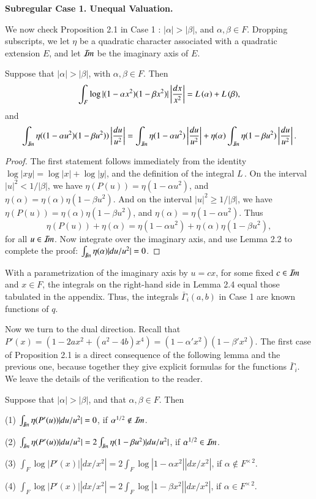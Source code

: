 \documentclass{amsart}
\newcommand\leftd[1]{\left | {d#1\over #1^2}\right |}
\newcommand\leftdx{\leftd x}
\newcommand\leftdu{\leftd u}
\newcommand\Imm{{\mathcal I\hskip-.2em m}}
\newcommand\LOG{{L\,}}
\newcommand\bGamma{\bar\Gamma}
\newenvironment{cthm}[1]
  {\renewcommand\thethm{\sc #1}\thm}
  {\endthm}
\begin{document}
\bigskip
\centerline{\bf Subregular Case 1. Unequal Valuation.}
\bigskip

We now check Proposition 2.1 in Case 1 : $|\alpha| >|\beta|$, and $\alpha,
\beta\in F$.  Dropping subscripts, we let $\eta$ be a quadratic character
associated with a quadratic extension $E$, and let $\Imm$ be the
imaginary axis of $E$.

\bigskip
\noindent
\begin{cthm}{Lemma 2.4}  Suppose that $|\alpha|>|\beta|$, with $\alpha,\beta\in F$.
Then
$$\int_{F} \log|(1-\alpha x^2)(1-\beta x^2)| \leftdx
  = \LOG(\alpha) + \LOG(\beta), $$
and
$$\int_{\Imm} \eta((1-\alpha u^2)(1-\beta u^2))\leftdu
  = \int_{\Imm}\eta(1-\alpha u^2) \leftdu +
\eta(\alpha) \int_{\Imm}\eta(1-\beta u^2)\leftdu.$$
\end{cthm}

\bigskip
\begin{proof}  The first statement follows immediately from the identity
$\log|xy| = \log|x|+\log|y|$, and the definition of the integral $\LOG$.
On the interval $|u|^2 < 1/|\beta|$, we have $\eta(P(u)) = \eta(1-\alpha u^2)$,
and $\eta(\alpha)=\eta(\alpha)\eta(1-\beta u^2)$.  
And on the interval
$|u|^2 \ge 1/|\beta|$, we have $\eta(P(u)) = \eta(\alpha)\eta(1-\beta u^2)$,
and $\eta(\alpha)=\eta(1-\alpha u^2)$.  Thus 
$$\eta(P(u)) + \eta(\alpha) = \eta(1-\alpha u^2) + \eta(\alpha)\eta(1-\beta u^2),$$
for all $u\in \Imm$.  Now integrate over the imaginary axis, and use Lemma 2.2
to complete the proof: $\int_{\Imm} \eta(\alpha) |du/u^2|=0$.
\end{proof}

With a parametrization of the imaginary axis by $u = cx$, for some 
fixed $c\in \Imm$
and $x\in F$, the integrals on the right-hand side 
in Lemma 2.4 equal those tabulated
in the appendix.  Thus, the integrals $\bGamma_i(a,b)$ in Case 1
are known functions
of $q$.

Now we turn to the dual direction.  Recall that $P'(x) = (1-2ax^2+(a^2-4b)x^4)
= (1-\alpha'x^2)(1-\beta'x^2)$.  The first case of Proposition 2.1
is a direct 
consequence of the following lemma and the previous one, because
together they give explicit formulas for the functions $\bGamma_i$.
We leave the details of
the verification to the reader.

\bigskip
\noindent
\begin{cthm}{Lemma 2.5}  Suppose that $|\alpha|>|\beta|$, and that $\alpha,\beta\in F$.
Then
\parskip=0pt

(1)  $\int_{\Imm}\eta(P'(u)) |du/u^2| = 0$, if $\alpha^{1/2}\not\in\Imm$.

(2)  $\int_{\Imm}\eta(P'(u)) |du/u^2| = 2\int_{\Imm}\eta(1-\beta u^2)|du/u^2|$,
       if $\alpha^{1/2}\in \Imm$.

(3)  $\int_{F}\log|P'(x)| |dx/x^2| = 2\int_{F}
        \log|1-\alpha x^2| |dx/x^2|$,
       if $\alpha\not\in F^{\times\,2}$.

(4) $\int_{F}\log|P'(x)| |dx/x^2| = 2\int_{F}\log|1-\beta x^2|
     |dx/x^2|$, if $\alpha\in F^{\times\,2}$.
\end{cthm}
\end{document}
